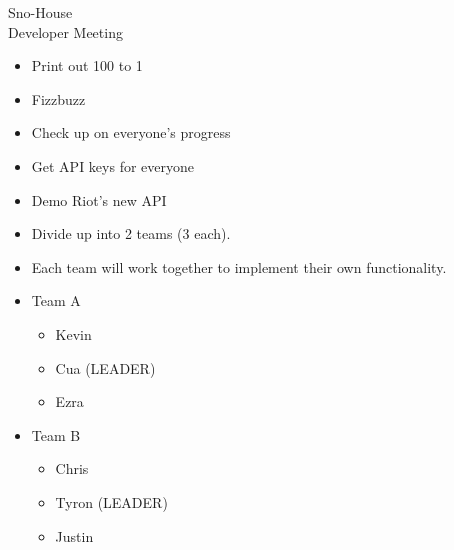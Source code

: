 \documentclass{article}
\begin{document}
\begin{Minutes}{Sno-House\\Developer Meeting}


\missingNoExcuse{%
}




\maketitle

\begin{itemize}
	\item Print out 100 to 1
	\item Fizzbuzz
\end{itemize}

\begin{itemize}
	\item Check up on everyone's progress
\end{itemize}

\begin{itemize}
	\item Get API keys for everyone
	\item Demo Riot's new API
\end{itemize}

\begin{itemize}
	\item Divide up into 2 teams (3 each).
	\item Each team will work together to implement their own functionality.
	\item Team A
	\begin{itemize}
		\item Kevin
		\item Cua (LEADER)
		\item Ezra
	\end{itemize}
	\item Team B
	\begin{itemize}
		\item Chris
		\item Tyron (LEADER)
		\item Justin
	\end{itemize}
\end{itemize}


\end{Minutes}
\end{document}
